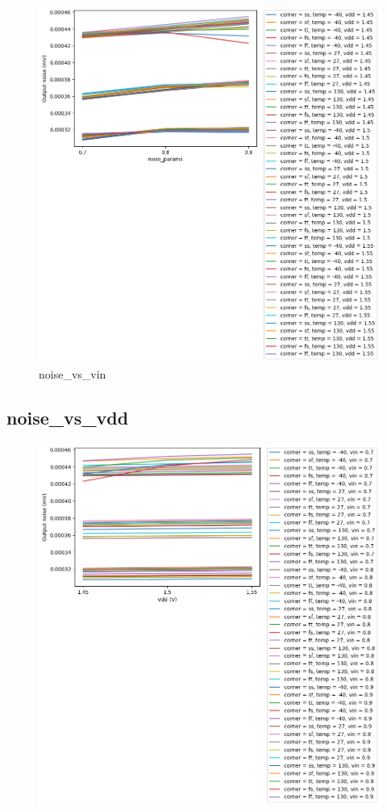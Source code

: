\documentclass[
  a4paper,
  DIV=11,
  numbers=noendperiod]{scrartcl}
\begin{document}
\begin{tcolorbox}
\begin{figure}[H]
{\centering \includegraphics{./cace/_docs/ota-5t/schematic/noise_vs_vin.png}

}

\caption{noise\_vs\_vin}

\end{figure}%

\subsection*{noise\_vs\_vdd}\label{noise_vs_vdd}

\begin{figure}[H]

{\centering \includegraphics{./cace/_docs/ota-5t/schematic/noise_vs_vdd.png}

}
\end{figure}
\end{tcolorbox}
\end{document}
